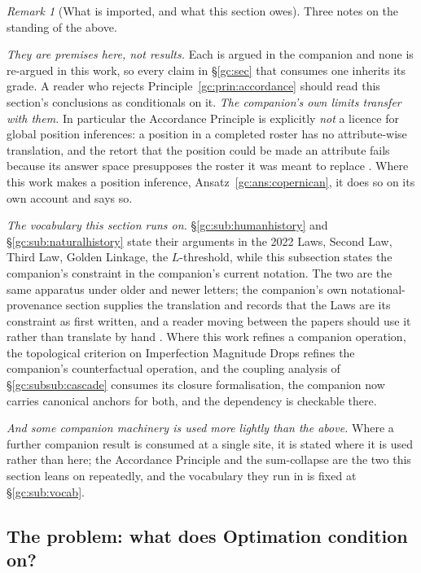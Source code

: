 \documentclass[11pt]{article}
\numberwithin{equation}{section}
\theoremstyle{plain}
\theoremstyle{definition}
\theoremstyle{remark}
\newtheorem{remark}[theorem]{Remark}
\begin{document}
\begin{remark}[What is imported, and what this section owes]
\label{gc:rem:importscope}
Three notes on the standing of the above.

\emph{They are premises here, not results.} Each is argued in the
companion and none is re-argued in this work, so every claim in
\S\ref{gc:sec} that consumes one inherits its grade. A reader who
rejects Principle~\ref{gc:prin:accordance} should read this section's
conclusions as conditionals on it. \emph{The companion's own limits transfer with them.} In particular the
Accordance Principle is explicitly \emph{not} a licence for global
position inferences: a position in a completed roster has no
attribute-wise translation, and the retort that the position could be
made an attribute fails because its answer space presupposes the roster
it was meant to replace \cite{NexicFoundation}. Where this work makes a
position inference, Ansatz~\ref{gc:ans:copernican}, it does so on
its own account and says so.

\emph{The vocabulary this section runs on.} \S\ref{gc:sub:humanhistory}
and \S\ref{gc:sub:naturalhistory} state their arguments in the 2022 Laws, Second Law, Third Law, Golden Linkage, the $L$-threshold, while
this subsection states the companion's constraint in the companion's
current notation. The two are the same apparatus under older and newer
letters; the companion's own notational-provenance section supplies the
translation and records that the Laws are its constraint as first
written, and a reader moving between the papers should use it rather than
translate by hand \cite{Nexus}. Where this work refines a companion
operation, the topological criterion on Imperfection Magnitude Drops
refines the companion's counterfactual operation, and the coupling
analysis of \S\ref{gc:subsub:cascade} consumes its closure formalisation, the companion now carries canonical anchors for both, and the
dependency is checkable there.

\emph{And some companion machinery is used more lightly than the above.}
Where a further companion result is consumed at a single site, it is
stated where it is used rather than here; the Accordance Principle and the
sum-collapse are the two this section leans on repeatedly, and the
vocabulary they run in is fixed at \S\ref{gc:sub:vocab}.
\end{remark}

\subsection{The problem: what does Optimation condition on?}
\label{gc:sub:problem}
\end{document}
